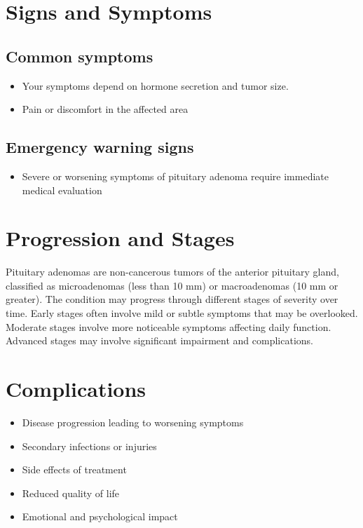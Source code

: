 \section{Signs and Symptoms}

\subsection{Common symptoms}
\begin{itemize}[noitemsep]
  \item Your symptoms depend on hormone secretion and tumor size.

  \item Pain or discomfort in the affected area
  \end{itemize}

\subsection{Emergency warning signs}
\begin{itemize}[noitemsep]
  \item Severe or worsening symptoms of pituitary adenoma require immediate medical evaluation
\end{itemize}
\section{Progression and Stages}
Pituitary adenomas are non-cancerous tumors of the anterior pituitary gland, classified as microadenomas (less than 10 mm) or macroadenomas (10 mm or greater). The condition may progress through different stages of severity over time. Early stages often involve mild or subtle symptoms that may be overlooked. Moderate stages involve more noticeable symptoms affecting daily function. Advanced stages may involve significant impairment and complications.
\section{Complications}
\begin{itemize}[noitemsep]
  \item Disease progression leading to worsening symptoms
  \item Secondary infections or injuries
  \item Side effects of treatment
  \item Reduced quality of life
  \item Emotional and psychological impact
\end{itemize}
